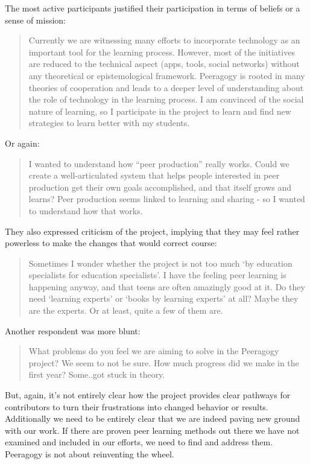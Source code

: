 \documentclass{acm_proc_article-sp}
\begin{document}
The most active participants justified their participation in terms of
beliefs or a sense of mission:

\begin{quote}
Currently we are witnessing many efforts to incorporate technology as
an important tool for the learning process. However, most of the
initiatives are reduced to the technical aspect (apps, tools, social
networks) without any theoretical or epistemological
framework. Peeragogy is rooted in many theories of cooperation and
leads to a deeper level of understanding about the role of technology
in the learning process. I am convinced of the social nature of
learning, so I participate in the project to learn and find new
strategies to learn better with my students.
\end{quote}

Or again:

\begin{quote}
I wanted to understand how ``peer production'' really works. Could we
create a well-articulated system that helps people interested in peer
production get their own goals accomplished, and that itself grows and
learns? Peer production seems linked to learning and sharing - so I
wanted to understand how that works.
\end{quote}

They also expressed criticism of the project, implying that they may feel rather powerless to make the changes that would correct course:

\begin{quote}
Sometimes I wonder whether the project is not too much `by education specialists for education specialists'. I have the feeling peer learning is happening anyway, and that teens are often amazingly good at it. Do they need `learning experts' or `books by learning experts' at all? Maybe they are the experts. Or at least, quite a few of them are.
\end{quote}

Another respondent was more blunt:

\begin{quote}
What problems do you feel we are aiming to solve in the Peeragogy
project? We seem to not be sure. How much progress did we make in the
first year? Some..got stuck in theory.
\end{quote}

But, again, it's not entirely clear how the project provides clear pathways for contributors to turn their frustrations into changed behavior or results. Additionally we need to be entirely clear that we are indeed paving new ground with our work. If there are proven peer learning methods out there we have not examined and included in our efforts, we need to find and address them. Peeragogy is not about reinventing the wheel.
\end{document}
